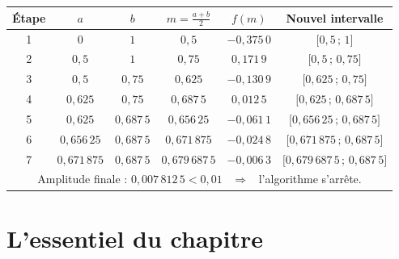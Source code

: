 \documentclass[11pt,a4paper]{article}
\newcommand{\intff}[2]{\mathopen{[}#1\,;\,#2\mathclose{]}}
\begin{document}
\begin{center}
\renewcommand{\arraystretch}{1.35}
\begin{tabular}{|c|c|c|c|c|c|}
\hline
\rowcolor{bleuclair}\textbf{Étape} & $a$ & $b$ & $m=\frac{a+b}{2}$ & $f(m)$ &
  \textbf{Nouvel intervalle} \\ \hline
1 & $0$ & $1$ & $0{,}5$ & $-0{,}375\,0$ & $\intff{0{,}5}{1}$ \\ \hline
2 & $0{,}5$ & $1$ & $0{,}75$ & $0{,}171\,9$ & $\intff{0{,}5}{0{,}75}$ \\ \hline
3 & $0{,}5$ & $0{,}75$ & $0{,}625$ & $-0{,}130\,9$ & $\intff{0{,}625}{0{,}75}$ \\ \hline
4 & $0{,}625$ & $0{,}75$ & $0{,}687\,5$ & $0{,}012\,5$ & $\intff{0{,}625}{0{,}687\,5}$ \\ \hline
5 & $0{,}625$ & $0{,}687\,5$ & $0{,}656\,25$ & $-0{,}061\,1$ & $\intff{0{,}656\,25}{0{,}687\,5}$ \\ \hline
6 & $0{,}656\,25$ & $0{,}687\,5$ & $0{,}671\,875$ & $-0{,}024\,8$ & $\intff{0{,}671\,875}{0{,}687\,5}$ \\ \hline
7 & $0{,}671\,875$ & $0{,}687\,5$ & $0{,}679\,687\,5$ & $-0{,}006\,3$ & $\intff{0{,}679\,687\,5}{0{,}687\,5}$ \\ \hline
\multicolumn{6}{|c|}{Amplitude finale : $0{,}007\,812\,5<0{,}01$ \ $\Longrightarrow$ \ l'algorithme s'arrête.} \\ \hline
\end{tabular}
\end{center}

\section*{L'essentiel du chapitre}
\end{document}
